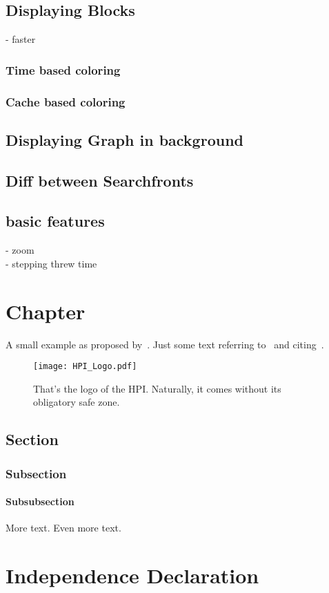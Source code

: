 \documentclass
[
	paper = a4,
    pagesize,
	12 pt,
	oneside,                       %
    open = right,
	DIV = calc,
	BCOR = 0 mm,                   %
	bibtotoc
]
{scrbook}
\begin{document}
\section{Displaying Blocks}
- faster\\

\subsection{Time based coloring}

\subsection{Cache based coloring}

\section{Displaying Graph in background}

\section{Diff between Searchfronts}

\section{basic features}
- zoom\\
- stepping threw time\\


\chapter{Chapter}

\lettrine[findent = -0.3 em, nindent = 0.7 em]{A}{} small example as proposed by~\citet{test}. Just some text referring to~ and citing~\citet{test2}.

\begin{figure}
    \centering
    \texttt{[image: HPI\_Logo.pdf]}
    \caption[HPI logo]{\label{fig:HPI}That’s the logo of the HPI. Naturally, it comes without its obligatory safe zone.}
\end{figure}

\section{Section}

\subsection{Subsection}

\subsubsection{Subsubsection}

\newpage
More text.
\newpage
Even more text.



\chapter*{Independence Declaration}

\end{document}
